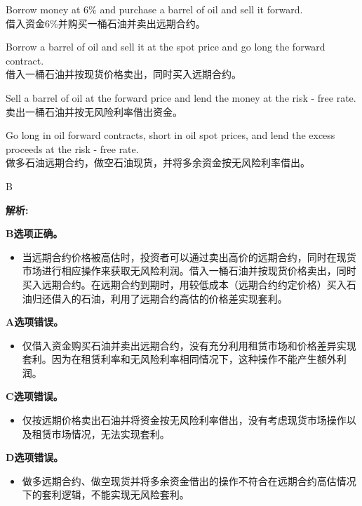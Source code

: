 \documentclass{article}
\newenvironment{explanation}
{\textbf{解析:}\par}
{\par}
\begin{document}
    \begin{choices}
        \item Borrow money at 6\% and purchase a barrel of oil and sell it forward.\\
        借入资金6\%并购买一桶石油并卖出远期合约。
        \item Borrow a barrel of oil and sell it at the spot price and go long the forward contract.\\
        借入一桶石油并按现货价格卖出，同时买入远期合约。
        \item Sell a barrel of oil at the forward price and lend the money at the risk - free rate.\\
        卖出一桶石油并按无风险利率借出资金。
        \item Go long in oil forward contracts, short in oil spot prices, and lend the excess proceeds at the risk - free rate.\\
        做多石油远期合约，做空石油现货，并将多余资金按无风险利率借出。
    \end{choices}
    
    \begin{correctanswer}
        B
    \end{correctanswer}
    
    \begin{explanation}
    \textbf{B选项正确。}
    \begin{itemize}
    \item 当远期合约价格被高估时，投资者可以通过卖出高价的远期合约，同时在现货市场进行相应操作来获取无风险利润。借入一桶石油并按现货价格卖出，同时买入远期合约。在远期合约到期时，用较低成本（远期合约约定价格）买入石油归还借入的石油，利用了远期合约高估的价格差实现套利。
    \end{itemize}
    \textbf{A选项错误。}
    \begin{itemize}
    \item 仅借入资金购买石油并卖出远期合约，没有充分利用租赁市场和价格差异实现套利。因为在租赁利率和无风险利率相同情况下，这种操作不能产生额外利润。
    \end{itemize}
    \textbf{C选项错误。}
    \begin{itemize}
    \item 仅按远期价格卖出石油并将资金按无风险利率借出，没有考虑现货市场操作以及租赁市场情况，无法实现套利。
    \end{itemize}
    \textbf{D选项错误。}
    \begin{itemize}
    \item 做多远期合约、做空现货并将多余资金借出的操作不符合在远期合约高估情况下的套利逻辑，不能实现无风险套利。
    \end{itemize}
    \end{explanation}
    
\end{document}
